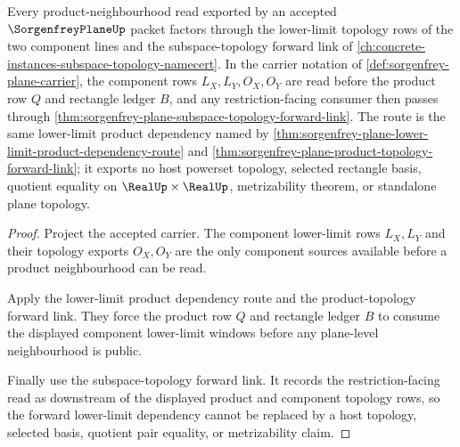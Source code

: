 \begin{theorem}
\label{thm:sorgenfrey-plane-forward-lower-limit-dependency}
Every product-neighbourhood read exported by an accepted $\SorgenfreyPlaneUp$ packet factors through the lower-limit topology rows of the two component lines and the subspace-topology forward link of \autoref{ch:concrete-instances-subspace-topology-namecert}. In the carrier notation of \autoref{def:sorgenfrey-plane-carrier}, the component rows $L_X,L_Y,O_X,O_Y$ are read before the product row $Q$ and rectangle ledger $B$, and any restriction-facing consumer then passes through \autoref{thm:sorgenfrey-plane-subspace-topology-forward-link}. The route is the same lower-limit product dependency named by \autoref{thm:sorgenfrey-plane-lower-limit-product-dependency-route} and \autoref{thm:sorgenfrey-plane-product-topology-forward-link}; it exports no host powerset topology, selected rectangle basis, quotient equality on $\RealUp\times\RealUp$, metrizability theorem, or standalone plane topology.
\end{theorem}
\begin{proof}
Project the accepted carrier. The component lower-limit rows $L_X,L_Y$ and their topology exports $O_X,O_Y$ are the only component sources available before a product neighbourhood can be read.

Apply the lower-limit product dependency route and the product-topology forward link. They force the product row $Q$ and rectangle ledger $B$ to consume the displayed component lower-limit windows before any plane-level neighbourhood is public.

Finally use the subspace-topology forward link. It records the restriction-facing read as downstream of the displayed product and component topology rows, so the forward lower-limit dependency cannot be replaced by a host topology, selected basis, quotient pair equality, or metrizability claim.
\end{proof}
